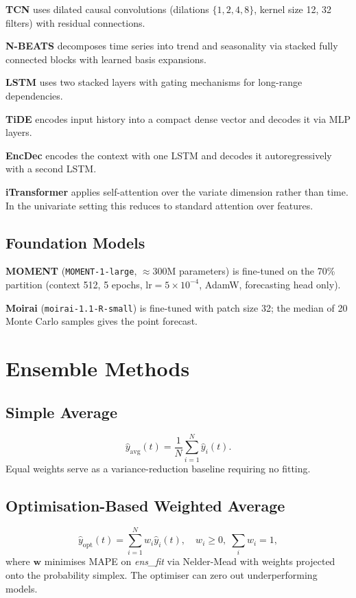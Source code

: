 \documentclass[conference]{IEEEtran}
\begin{document}
\textbf{TCN} \cite{bai2018} uses dilated causal convolutions (dilations
$\{1,2,4,8\}$, kernel size 12, 32 filters) with residual connections.

\textbf{N-BEATS} \cite{oreshkin2020} decomposes time series into trend and
seasonality via stacked fully connected blocks with learned basis expansions.

\textbf{LSTM} uses two stacked layers with gating mechanisms for long-range
dependencies.

\textbf{TiDE} \cite{das2024tide} encodes input history into a compact dense
vector and decodes it via MLP layers.

\textbf{EncDec} encodes the context with one LSTM and decodes it
autoregressively with a second LSTM.

\textbf{iTransformer} \cite{liu2024itransformer} applies self-attention over
the variate dimension rather than time. In the univariate setting this reduces
to standard attention over features.

\subsection{Foundation Models}
\textbf{MOMENT} (\texttt{MOMENT-1-large}, $\approx$300M parameters)
\cite{goswami2024moment} is fine-tuned on the 70\% partition (context 512,
5 epochs, $\mathrm{lr}=5{\times}10^{-4}$, AdamW, forecasting head only).

\textbf{Moirai} (\texttt{moirai-1.1-R-small}) \cite{woo2024moirai} is
fine-tuned with patch size 32; the median of 20 Monte Carlo samples gives the
point forecast.

\section{Ensemble Methods}
\label{sec:ensemble}

\subsection{Simple Average}
\begin{equation}
  \hat{y}_{\mathrm{avg}}(t) = \frac{1}{N}\sum_{i=1}^{N}\hat{y}_i(t).
\end{equation}
Equal weights serve as a variance-reduction baseline requiring no fitting.

\subsection{Optimisation-Based Weighted Average}
\begin{equation}
  \hat{y}_{\mathrm{opt}}(t) = \sum_{i=1}^{N}w_i\hat{y}_i(t),\quad
  w_i\ge0,\;\textstyle\sum_i w_i=1,
\end{equation}
where $\mathbf{w}$ minimises MAPE on \textit{ens\_fit} via Nelder-Mead
\cite{nelder1965} with weights projected onto the probability simplex. The
optimiser can zero out underperforming models.
\end{document}
